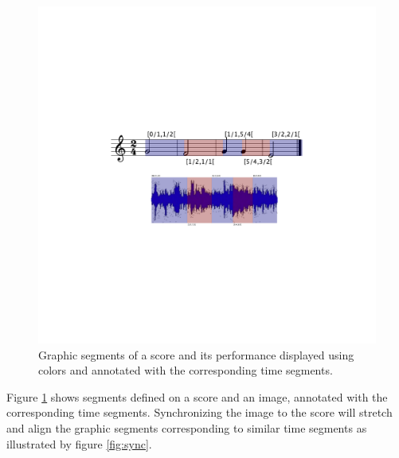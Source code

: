 \documentclass[11pt,letterpaper]{article}
\begin{document}
\begin{figure}[h]
\begin{center}
	\includegraphics[width=0.98\columnwidth]{rsrc/segmentation}
\caption{Graphic segments of a score and its performance displayed using colors and annotated with the corresponding time segments.}
\label{fig:segm}
\end{center}
\end{figure}

Figure \ref{fig:segm} shows segments defined on a score and an image, annotated with the corresponding time segments. Synchronizing the image to the score will stretch and align the graphic segments corresponding to similar time segments as illustrated by figure \ref{fig:sync}.
\end{document}
